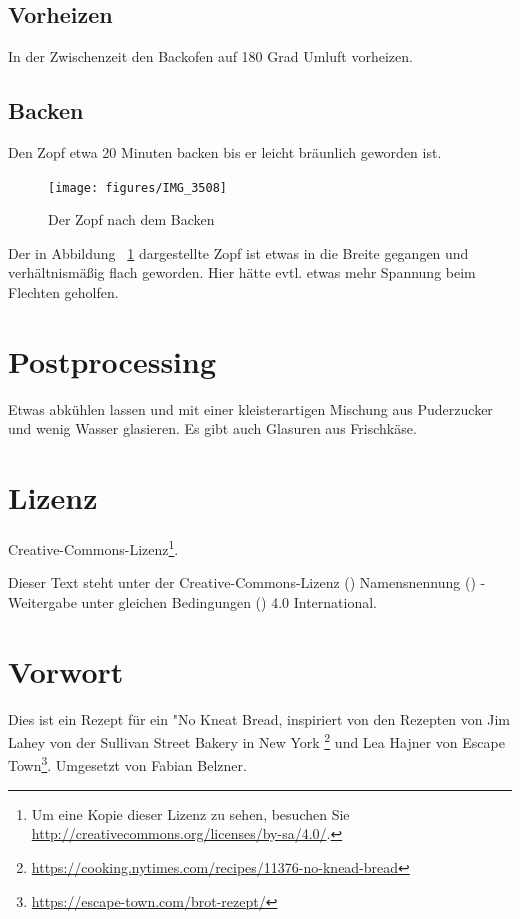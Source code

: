 \documentclass[a4paper, oneside]{recipe}
\begin{document}
\subsection*{Vorheizen}
In der Zwischenzeit den Backofen auf 180 Grad Umluft vorheizen.

\subsection*{Backen}
Den Zopf etwa 20 Minuten backen bis er leicht bräunlich geworden ist.

\begin{figure}[!ht]
  \centering
  \texttt{[image: figures/IMG\_3508]}
  \caption{Der Zopf nach dem Backen}
  \label{fig:zopf_fertig}
\end{figure}

Der in Abbildung ~\ref{fig:zopf_fertig} dargestellte Zopf ist etwas in die Breite gegangen und verhältnismäßig flach geworden. Hier hätte evtl. etwas mehr Spannung beim Flechten geholfen.

\section*{Postprocessing}
Etwas abkühlen lassen und mit einer kleisterartigen Mischung aus Puderzucker und wenig Wasser glasieren. Es gibt auch Glasuren aus Frischkäse.

\section*{Lizenz}
\ccbysa{} Creative-Commons-Lizenz\footnote{Um eine Kopie dieser Lizenz zu sehen, besuchen Sie \url{http://creativecommons.org/licenses/by-sa/4.0/}.}.

Dieser Text steht unter der Creative-Commons-Lizenz (\ccLogo) Namensnennung (\ccAttribution) - Weitergabe unter gleichen Bedingungen (\ccShareAlike) 4.0 International. 


\section*{Vorwort}
Dies ist ein Rezept für ein "No Kneat Bread, inspiriert von den Rezepten von Jim Lahey von der Sullivan Street Bakery in New York \footnote{\url{https://cooking.nytimes.com/recipes/11376-no-knead-bread}} und Lea Hajner von Escape Town\footnote{\url{https://escape-town.com/brot-rezept/}}. Umgesetzt von Fabian Belzner.\\
\end{document}
